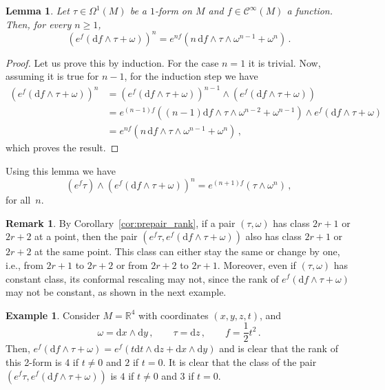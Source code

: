 \documentclass[11pt,twoside]{article}
\theoremstyle{plain}
\newtheorem{lemma}[theorem]{Lemma}
\theoremstyle{definition}
\newtheorem{remark}[theorem]{Remark}
\newtheorem{example}[theorem]{Example}
\newcommand{\R}{\mathbb{R}}
\renewcommand{\d}{\mathrm{d}}
\newcommand{\Cinfty}{\mathscr{C}^\infty}
\def\d{\mathrm{d}}
\def\d{\mathrm{d}}
\begin{document}
\begin{lemma} 
\label{lemma_formula_ef_times_form}
Let $\tau\in\Omega^1(M)$ be a $1$-form on $M$ and $f\in \Cinfty(M)$ a function. 
Then, for every $n \geq 1$, 
$$ (e^f(\d f\wedge \tau +\omega))^n = e^{nf}(n\, \d f \wedge\tau\wedge\omega^{n-1}+\omega^n)\,.$$
\end{lemma}
\begin{proof}
    Let us prove this by induction. For the case $n=1$ it is trivial.
    Now, assuming it is true for $n-1$, for the induction step we have
    \begin{align}
        (e^f(\d f\wedge \tau +\omega))^n &= (e^f(\d f\wedge \tau +\omega))^{n-1}\wedge(e^f(\d f\wedge \tau +\omega))
        \\
        &= e^{(n-1)f}((n-1)\d f\wedge \tau \wedge \omega^{n-2} + \omega^{n-1}) \wedge e^f(\d f\wedge\tau + \omega)
        \\
        &=e^{nf}(n\, \d f \wedge\tau\wedge\omega^{n-1}+\omega^n)\,,
    \end{align}
    which proves the result.
\end{proof}

Using this lemma we have
\begin{equation}\label{eq:after_lemma_eq}
    (e^f\tau) \wedge (e^f(\d f\wedge \tau +\omega))^n = e^{(n+1)f}(\tau \wedge \omega^n)\,,
\end{equation}
for all~$n$.

\begin{remark}
By Corollary~\ref{cor:prepair_rank}, 
if a pair $(\tau,\omega)$ has class $2r+1$ or $2r+2$ at a point, 
then the pair $(e^f \tau , e^f(\d f \wedge\tau + \omega))$ also has class $2r+1$ or $2r+2$ at the same point.
This class can either stay the same or change by one, i.e., from $2r+1$ to $2r+2$ or from $2r+2$ to $2r+1$. 
Moreover, even if $(\tau,\omega)$ has constant class,
its conformal rescaling may not, 
since the rank of $e^f(\d f \wedge\tau + \omega)$ may not be constant,
as shown in the next example.
\end{remark}

\begin{example} 
Consider $M = \R ^4$ with coordinates $(x,y,z,t)$, and 
$$\omega = \d x \wedge \d y\,, \qquad \tau = \d z\,, \qquad f= \frac{1}{2}t^2\,.$$
Then, $e^f(\d f \wedge \tau + \omega) = e^f (t\d t\wedge \d z +\d x \wedge \d y)$ and is clear that the rank of this 2-form is 4 if $t\neq 0$ and $2$ if $t=0$. 
It is clear that the class of the pair $(e^f\tau, e^f(\d f \wedge \tau + \omega))$ is $4$ if $t\neq0 $ and 3 if $t=0$. 
\end{example}
\end{document}
